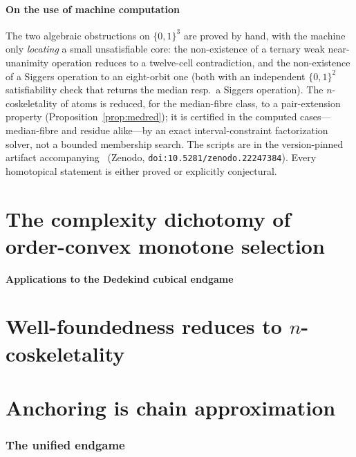 \documentclass[11pt]{amsart}
\theoremstyle{plain}
\theoremstyle{definition}
\newcommand{\B}{\{0,1\}}
\begin{document}
\subsection*{On the use of machine computation}
The two algebraic obstructions on $\B^3$ are proved by hand, with the
machine only \emph{locating} a small unsatisfiable core: the
non-existence of a ternary weak near-unanimity operation reduces to a
twelve-cell contradiction, and the non-existence of a Siggers operation
to an eight-orbit one (both with an independent $\B^2$ satisfiability
check that returns the median resp.\ a Siggers operation).  The $n$-coskeletality of atoms is reduced, for the median-fibre class,
to a pair-extension property (Proposition~\ref{prop:medred}); it is
certified in the computed cases---median-fibre and residue alike---by an
exact interval-constraint factorization solver, not a bounded membership
search.  The
scripts are in the version-pinned artifact accompanying~\cite{PaperW}
(Zenodo, \texttt{doi:10.5281/zenodo.22247384}).  Every homotopical
statement is either proved or explicitly conjectural.

\part{The complexity dichotomy of order-convex monotone selection}
\label{part:cx}



\bigskip
\begin{center}\large\bfseries Applications to the Dedekind cubical endgame\end{center}
\nopagebreak

\part{Well-foundedness reduces to $n$-coskeletality}
\label{part:a}



\part{Anchoring is chain approximation}
\label{part:b}



\section{The unified endgame}
\label{sec:unified}
\end{document}
